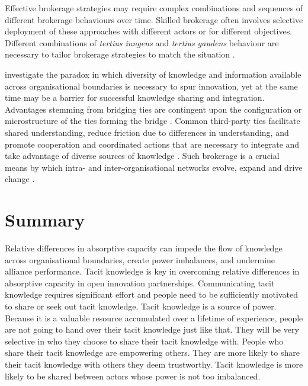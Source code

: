 Effective brokerage strategies may require complex combinations and sequences of different brokerage behaviours over time. Skilled brokerage often involves selective deployment of these approaches with different actors or for different objectives. Different combinations of \emph{tertius iungens} and \emph{tertius gaudens} behaviour are necessary to tailor brokerage strategies to match the situation \citep{obstfeld2014brokerage}. 

\citet{tortoriello2010activating} investigate the paradox in which diversity of knowledge and information available across organisational boundaries is necessary to spur innovation, yet at the same time may be a barrier for successful knowledge sharing and integration. Advantages stemming from bridging ties are contingent upon the configuration or microstructure of the ties forming the bridge \citep{tortoriello2010activating,tortoriello2015social}. Common third-party ties facilitate shared understanding, reduce friction due to differences in understanding, and promote cooperation and coordinated actions that are necessary to integrate and take advantage of diverse sources of knowledge \citep{tortoriello2010activating}. Such brokerage is a crucial means by which intra- and inter-organisational networks evolve, expand and drive change \citep{obstfeld2014brokerage}.  \medskip


\section{Summary}

Relative differences in absorptive capacity can impede the flow of knowledge across organisational boundaries, create power imbalances, and undermine alliance performance. Tacit knowledge is key in overcoming relative differences in absorptive capacity in open innovation partnerships. Communicating tacit knowledge requires significant effort and people need to be sufficiently motivated to share or seek out tacit knowledge. Tacit knowledge is a source of power. Because it is a valuable resource accumulated over a lifetime of experience, people are not going to hand over their tacit knowledge just like that. They will be very selective in who they choose to share their tacit knowledge with. People who share their tacit knowledge are empowering others. They are more likely to share their tacit knowledge with others they deem trustworthy. Tacit knowledge is more likely to be shared between actors whose power is not too imbalanced.


